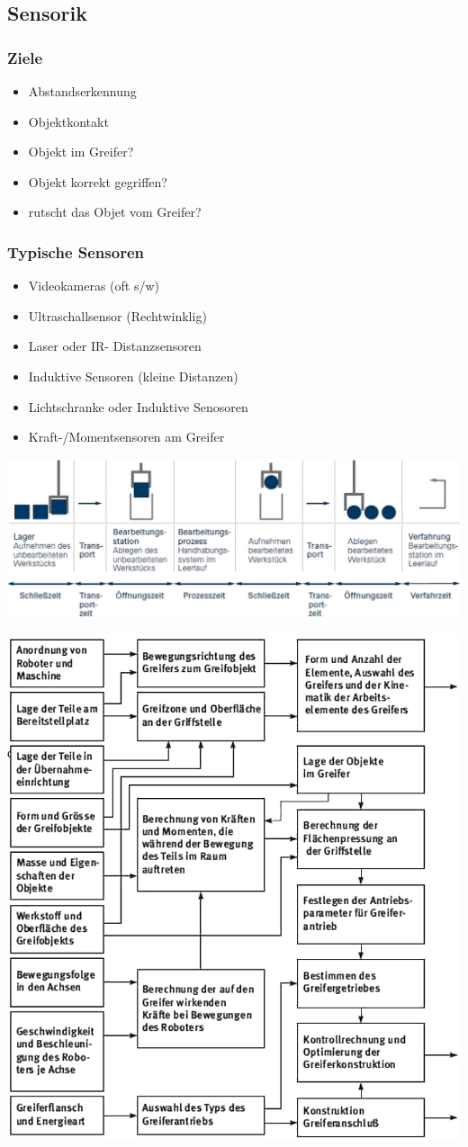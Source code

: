 \subsection{Sensorik}
\begin{minipage}{0.5\linewidth}
    \subsubsection{Ziele}
   \begin{itemize}
       \item Abstandserkennung
       \item Objektkontakt
       \item Objekt im Greifer?
       \item Objekt korrekt gegriffen?
       \item rutscht das Objet vom Greifer?
   \end{itemize}
\end{minipage}
\begin{minipage}{0.5\linewidth}
    \subsubsection{Typische Sensoren}
    \begin{itemize}
        \item Videokameras (oft s/w)
        \item Ultraschallsensor (Rechtwinklig)
        \item Laser oder IR- Distanzsensoren
        \item Induktive Sensoren (kleine Distanzen)
        \item Lichtschranke oder Induktive Senosoren
        \item Kraft-/Momentsensoren am Greifer
    \end{itemize}
\end{minipage}
 \includegraphics[width=\linewidth]{./bilder/GreiferZyklus}

 \includegraphics[width=0.7\linewidth]{./bilder/GreiferProject}